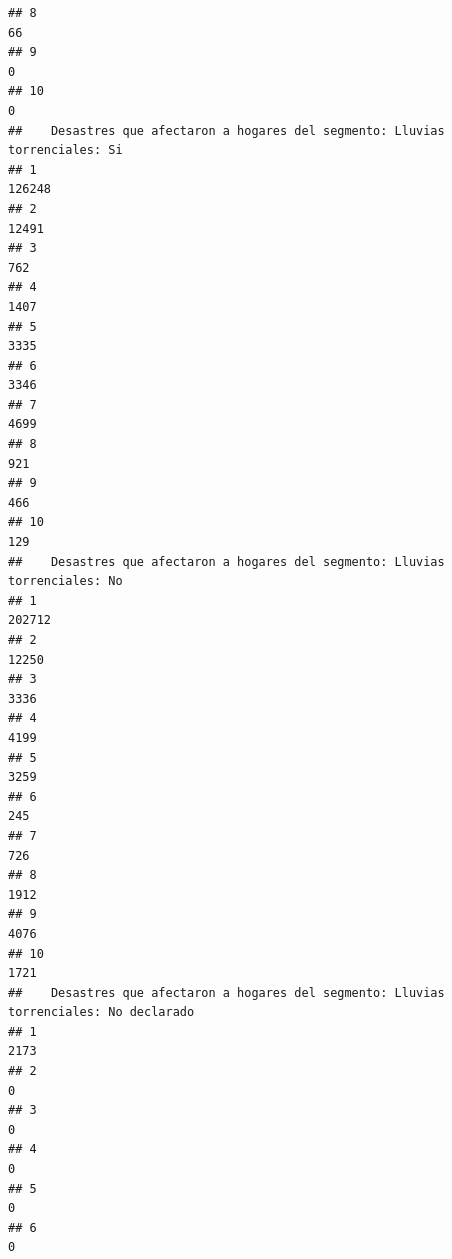 \documentclass[11pt,]{article}
\begin{document}
\begin{verbatim}
## 8                                                                          66
## 9                                                                           0
## 10                                                                          0
##    Desastres que afectaron a hogares del segmento: Lluvias torrenciales: Si
## 1                                                                    126248
## 2                                                                     12491
## 3                                                                       762
## 4                                                                      1407
## 5                                                                      3335
## 6                                                                      3346
## 7                                                                      4699
## 8                                                                       921
## 9                                                                       466
## 10                                                                      129
##    Desastres que afectaron a hogares del segmento: Lluvias torrenciales: No
## 1                                                                    202712
## 2                                                                     12250
## 3                                                                      3336
## 4                                                                      4199
## 5                                                                      3259
## 6                                                                       245
## 7                                                                       726
## 8                                                                      1912
## 9                                                                      4076
## 10                                                                     1721
##    Desastres que afectaron a hogares del segmento: Lluvias torrenciales: No declarado
## 1                                                                                2173
## 2                                                                                   0
## 3                                                                                   0
## 4                                                                                   0
## 5                                                                                   0
## 6                                                                                   0

\end{verbatim}
\end{document}
